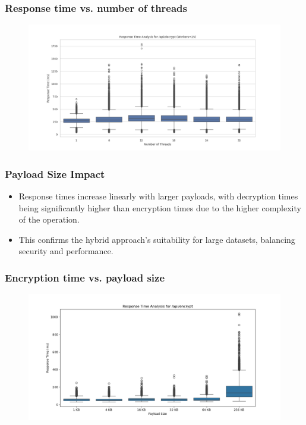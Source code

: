 \documentclass{beamer}
\begin{document}
\begin{frame}
\frametitle{Response time vs. number of threads}
\begin{figure}
\includegraphics[width=\textwidth,height=0.7\textheight,keepaspectratio]{images/phase1/api_decrypt/response_time_workers_25.png}
\end{figure}
\end{frame}

\begin{frame}
\frametitle{Payload Size Impact}
\begin{itemize}
\item Response times increase linearly with larger payloads, with decryption times being significantly higher than encryption times due to the higher complexity of the operation.
\item This confirms the hybrid approach's suitability for large datasets, balancing security and performance.
\end{itemize}
\end{frame}

\begin{frame}
\frametitle{Encryption time vs. payload size}
\begin{figure}
\includegraphics[width=\textwidth,height=0.7\textheight,keepaspectratio]{images/phase2/response_time_api_encrypt.png}
\end{figure}
\end{frame}
\end{document}
